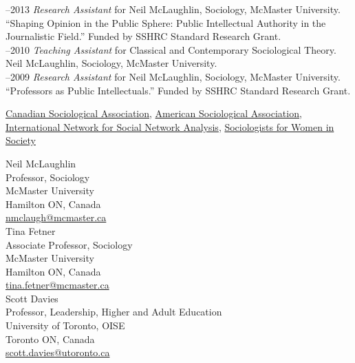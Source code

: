\documentclass[9pt,usenames,dvipsnames]{article}
\begin{document}
\newpage
{}

–2013 {\it Research Assistant} for Neil McLaughlin, Sociology, McMaster University. ``Shaping Opinion in the Public Sphere: Public Intellectual Authority in the Journalistic Field.'' Funded by SSHRC Standard Research Grant.\\

–2010 {\it Teaching Assistant} for Classical and Contemporary Sociological Theory. Neil McLaughlin, Sociology, McMaster University.\\

–2009 {\it Research Assistant} for Neil McLaughlin, Sociology, McMaster University.\\
``Professors as Public Intellectuals.'' Funded by SSHRC Standard Research Grant.\\

\smallskip
{}

\noindent \href{http://www.csa-scs.ca}{Canadian Sociological Association}, \href{http://www.asanet.org}{American Sociological Association}, \href{http://www.insna.org}{International Network for Social Network Analysis}, \href{http://www.socwomen.org}{Sociologists for Women in Society} \\

\smallskip
{}

\noindent Neil McLaughlin \\
\noindent Professor, Sociology \\
\noindent McMaster University \\
\noindent Hamilton ON, Canada \\
\noindent \href{mailto:nmclaugh@mcmaster.ca}{nmclaugh@mcmaster.ca} \\

\noindent Tina Fetner \\
\noindent Associate Professor, Sociology \\
\noindent McMaster University \\
\noindent Hamilton ON, Canada \\
\noindent \href{mailto:tina.fetner@mcmaster.ca}{tina.fetner@mcmaster.ca} \\

\noindent Scott Davies \\
\noindent Professor, Leadership, Higher and Adult Education \\
\noindent University of Toronto, OISE \\ 
\noindent Toronto ON, Canada \\
\noindent \href{mailto:scott.davies@utoronto.ca}{scott.davies@utoronto.ca}
\end{document}
